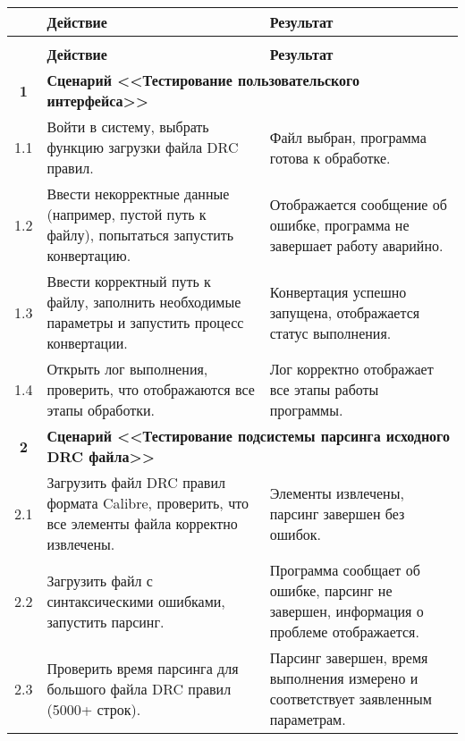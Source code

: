 \begin{longtable}{|c|p{7.5cm}|p{7.5cm}|}
	\caption{} \label{table:test} \\
	\hline
	\textbf{\No} & \textbf{Действие} & \textbf{Результат} \\
	\hline
	\endfirsthead
	\conttable{table:test} \\
	\hline
	\textbf{\No} & \textbf{Действие} & \textbf{Результат} \\
	\hline
	\endhead

	\textbf{1}
	& \multicolumn{2}{|l|}{\textbf{
		Сценарий <<Тестирование пользовательского интерфейса>>}} \\ \hline
	1.1
	& Войти в систему, выбрать функцию загрузки файла DRC правил.
	& Файл выбран, программа готова к обработке. \\ \hline

	1.2
	& Ввести некорректные данные (например, пустой путь к файлу),
	попытаться запустить конвертацию.
	& Отображается сообщение об ошибке,
	программа не завершает работу аварийно. \\ \hline

	1.3
	& Ввести корректный путь к файлу,
	заполнить необходимые параметры и запустить процесс конвертации.
	& Конвертация успешно запущена, отображается статус выполнения. \\ \hline

	1.4
	& Открыть лог выполнения, проверить, что отображаются все этапы обработки.
	& Лог корректно отображает все этапы работы программы. \\ \hline

	\textbf{2}
	& \multicolumn{2}{|p{15cm}|}{\textbf{Сценарий
		<<Тестирование подсистемы парсинга исходного DRC файла>>}} \\ \hline
	2.1
	& Загрузить файл DRC правил формата Calibre,
	проверить, что все элементы файла корректно извлечены.
	& Элементы извлечены, парсинг завершен без ошибок. \\ \hline

	2.2
	& Загрузить файл с синтаксическими ошибками, запустить парсинг.
	& Программа сообщает об ошибке, парсинг не завершен,
	информация о проблеме отображается. \\ \hline

	2.3
	& Проверить время парсинга для большого файла DRC правил (5000+ строк).
	& Парсинг завершен, время выполнения измерено
	и соответствует заявленным параметрам. \\ \hline


\end{longtable}
